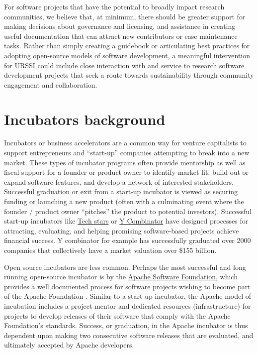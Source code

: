 \documentclass[
]{book}
\begin{document}
For software projects that have the potential to broadly impact research communities, we believe that, at minimum, there should be greater support for making decisions about governance and licensing, and assistance in creating useful documentation that can attract new contributors or ease maintenance tasks.
Rather than simply creating a guidebook or articulating best practices for adopting open-source models of software development, a meaningful intervention for URSSI could include close interaction with and service to research software development projects that seek a route towards sustainability through community engagement and collaboration.

\hypertarget{incubators-background}{%
\section{Incubators background}\label{incubators-background}}

Incubators or business accelerators are a common way for venture capitalists to support entrepreneurs and ``start-up'' companies attempting to break into a new market.
These types of incubator programs often provide mentorship as well as fiscal support for a founder or product owner to identify market fit, build out or expand software features, and develop a network of interested stakeholders.
Successful graduation or exit from a start-up incubator is viewed as securing funding or launching a new product (often with a culminating event where the founder / product owner ``pitches'' the product to potential investors).
Successful start-up incubators like \href{http://www.techstars.com/}{Tech stars} or \href{https://www.ycombinator.com/}{Y Combinator} have designed processes for attracting, evaluating, and helping promising software-based projects achieve financial success. Y combinator for example has successfully graduated over 2000 companies that collectively have a market valuation over \$155 billion.

Open source incubators are less common. Perhaps the most successful and long running open-source incubator is by the \href{https://incubator.apache.org/}{Apache Software Foundation}, which provides a well documented process for software projects wishing to become part of the Apache Foundation \citep{schweik2012internet}.
Similar to a start-up incubator, the Apache model of incubation includes a project mentor and dedicated resources (infrastructure) for projects to develop releases of their software that comply with the Apache Foundation's standards.
Success, or graduation, in the Apache incubator is thus dependent upon making two consecutive software releases that are evaluated, and ultimately accepted by Apache developers.
\end{document}
